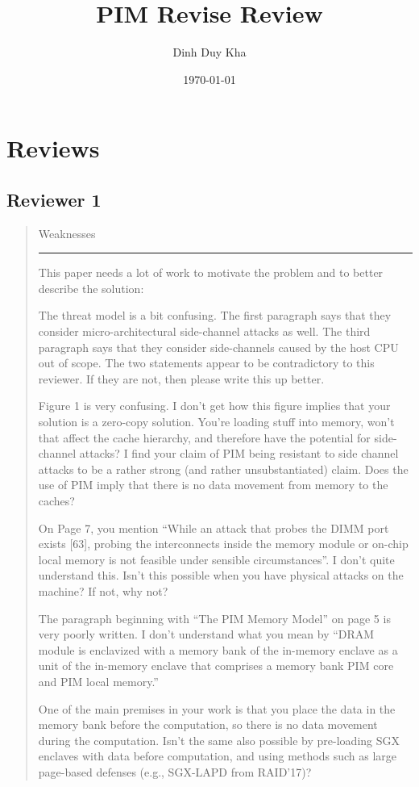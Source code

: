 \documentclass[11pt]{article}
\author{Dinh Duy Kha}
\date{\today}
\title{PIM Revise Review}
\begin{document}
\maketitle

\section{Reviews}
\label{sec:org9b2c5e1}
\subsection{Reviewer 1}
\label{sec:org9635d09}
\begin{quote}
Weaknesses

\noindent\rule{\textwidth}{0.5pt}
This paper needs a lot of work to motivate the problem and to better describe the solution:

The threat model is a bit confusing. The first paragraph says that they consider micro-architectural side-channel attacks as well. The third paragraph says that they consider side-channels caused by the host CPU out of scope. The two statements appear to be contradictory to this reviewer. If they are not, then please write this up better.

Figure 1 is very confusing. I don't get how this figure implies that your solution is a zero-copy solution. You're loading stuff into memory, won't that affect the cache hierarchy, and therefore have the potential for side-channel attacks? I find your claim of PIM being resistant to side channel attacks to be a rather strong (and rather unsubstantiated) claim. Does the use of PIM imply that there is no data movement from memory to the caches?

On Page 7, you mention ``While an attack that probes the DIMM port exists [63], probing the interconnects inside the memory module or on-chip local memory is not feasible under sensible circumstances''. I don't quite understand this. Isn't this possible when you have physical attacks on the machine? If not, why not?

The paragraph beginning with ``The PIM Memory Model'' on page 5 is very poorly written. I don't understand what you mean by ``DRAM module is enclavized with a memory bank of the in-memory enclave as a unit of the in-memory enclave that comprises a memory bank PIM core and PIM local memory.''

One of the main premises in your work is that you place the data in the memory bank before the computation, so there is no data movement during the computation. Isn't the same also possible by pre-loading SGX enclaves with data before computation, and using methods such as large page-based defenses (e.g., SGX-LAPD from RAID'17)?
\end{quote}
\end{document}
